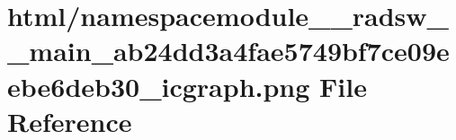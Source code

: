 \hypertarget{namespacemodule____radsw____main__ab24dd3a4fae5749bf7ce09eebe6deb30__icgraph_8png}{}\section{html/namespacemodule\+\_\+\+\_\+radsw\+\_\+\+\_\+main\+\_\+ab24dd3a4fae5749bf7ce09eebe6deb30\+\_\+icgraph.png File Reference}
\label{namespacemodule____radsw____main__ab24dd3a4fae5749bf7ce09eebe6deb30__icgraph_8png}
